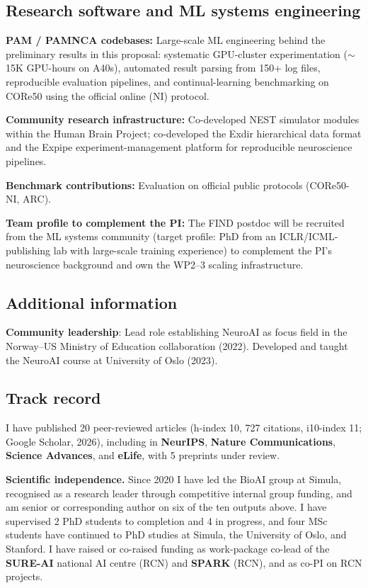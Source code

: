 \subsection*{Research software and ML systems engineering}

\noindent\textbf{PAM / PAMNCA codebases:} Large-scale ML engineering behind the preliminary results in this proposal: systematic GPU-cluster experimentation ($\sim$15K GPU-hours on A40s), automated result parsing from 150+ log files, reproducible evaluation pipelines, and continual-learning benchmarking on CORe50 using the official online (NI) protocol.

\noindent\textbf{Community research infrastructure:} Co-developed NEST simulator modules within the Human Brain Project; co-developed the Exdir hierarchical data format and the Expipe experiment-management platform for reproducible neuroscience pipelines.

\noindent\textbf{Benchmark contributions:} Evaluation on official public protocols (CORe50-NI, ARC).

\noindent\textbf{Team profile to complement the PI:} The FIND postdoc will be recruited from the ML systems community (target profile: PhD from an ICLR/ICML-publishing lab with large-scale training experience) to complement the PI's neuroscience background and own the WP2--3 scaling infrastructure.

\subsection*{Additional information}

\noindent\textbf{Community leadership}: Lead role establishing NeuroAI as focus field in the Norway--US Ministry of Education collaboration (2022). Developed and taught the NeuroAI course at University of Oslo (2023).

\subsection*{Track record}

\noindent I have published 20 peer-reviewed articles (h-index 10, 727 citations, i10-index 11; Google Scholar, 2026), including in \textbf{NeurIPS}, \textbf{Nature Communications}, \textbf{Science Advances}, and \textbf{eLife}, with 5 preprints under review.

\noindent\textbf{Scientific independence.} Since 2020 I have led the BioAI group at Simula, recognised as a research leader through competitive internal group funding, and am senior or corresponding author on six of the ten outputs above. I have supervised 2 PhD students to completion and 4 in progress, and four MSc students have continued to PhD studies at Simula, the University of Oslo, and Stanford. I have raised or co-raised funding as work-package co-lead of the \textbf{SURE-AI} national AI centre (RCN) and \textbf{SPARK} (RCN), and as co-PI on RCN projects.

